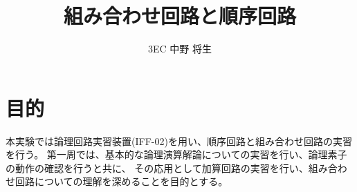 \documentclass[dvipdfmx]{jsarticle}
\begin{document}
	\title{組み合わせ回路と順序回路}
	\author{3EC 中野 将生}
	\maketitle
	\section{目的}
		本実験では論理回路実習装置(IFF-02)を用い、順序回路と組み合わせ回路の実習を行う。
		第一周では、基本的な論理演算解論についての実習を行い、論理素子の動作の確認を行うと共に、
		その応用として加算回路の実習を行い、組み合わせ回路についての理解を深めることを目的とする。
\end{document}
